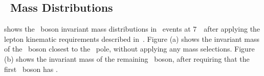 
\subsection{\Z\ Mass Distributions}

 shows the \Z\ boson invariant mass distributions in \ZZllll\ events at
7~\tev\ after applying the lepton kinematic requirements described
in~. Figure (a) shows the invariant
mass of the \Z\ boson closest to the \Z\ pole, without applying any mass
selections. Figure (b) shows the invariant
mass of the remaining \Z\ boson, after requiring that the first \Z\ boson
has \sstooos.

